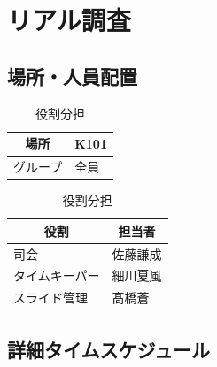 \newpage

\section{リアル調査}  %

\subsection{場所・人員配置}
\begin{table}[h]
  \centering
  \begin{minipage}[t]{0.48\columnwidth}
    \centering
    \caption{場所・該当グループ}
    \begin{tabular}{cl}
      \hline
      場所 & K101 \\
      \hline
      グループ & 全員 \\
      \hline
    \end{tabular}
  \end{minipage}
  \begin{minipage}[t]{0.48\columnwidth}
    \centering
    \caption{役割分担}
    \begin{tabular}{ll}
      \hline
      \multicolumn{1}{c}{役割} & \multicolumn{1}{c}{担当者} \\
      \hline
      司会 & 佐藤謙成 \\
      タイムキーパー & 細川夏風 \\
      スライド管理 & 髙橋蒼 \\
      \hline
    \end{tabular}
  \end{minipage}
\end{table}

\subsection{詳細タイムスケジュール}
\vspace{0.5em}
\fontsize{8pt}{12pt}\selectfont

